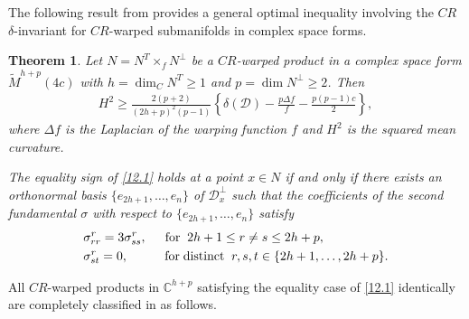 \documentclass{amsart}
\theoremstyle{plain}
\newtheorem{theorem}{Theorem}[section]
\numberwithin{equation}{section}
\theoremstyle{remark}
\numberwithin{equation}{section}
\begin{document}
The following result from \cite{c12} provides a general optimal inequality involving the $CR$ $\delta$-invariant for $CR$-warped submanifolds in complex space forms.

\begin{theorem} \label{T:12.1} Let $N=N^T\times_f N^\perp$ be a $CR$-warped product in a complex space form $\tilde M^{h+p}(4c)$ with $h=\dim_{C}N^T\geq 1$ and $p=\dim N^\perp\geq 2$. Then 
\begin{align}\label{12.1} H^2\geq \frac{2(p+2)}{(2h+p)^2(p-1)}\! \left\{\delta(\mathcal D)-\frac{p\Delta f}{f}-\frac{p(p-1)c}{2}\right\},\end{align}
where $\Delta f$ is the Laplacian of the warping function $f$ and $H^{2}$ is the squared mean curvature.

The equality sign of \eqref{12.1} holds at a point $x\in N$ if and only if there exists an orthonormal basis $\{e_{2h+1},\ldots,e_n\}$ of $\mathcal D_x^\perp$ such that the coefficients of the second fundamental $\sigma$ with respect to $\{e_{2h+1},\ldots,e_n\}$ satisfy
\begin{equation}\begin{aligned}\notag &\sigma^r_{rr}=3\sigma^r_{ss}, \hskip.2in {\rm for}\;\;  2h+1\leq r\ne s\leq 2h+p,\\& \sigma^r_{st}=0,\hskip .4in {\rm for \; distinct}\; \; r,s,t\in \{2h+1,\ldots,2h+p\}.\end{aligned}\end{equation}
\end{theorem}

All $CR$-warped products in ${\mathbb C}^{h+p}$ satisfying the equality case of \eqref{12.1} identically are completely classified in \cite{c12} as follows.
\end{document}
